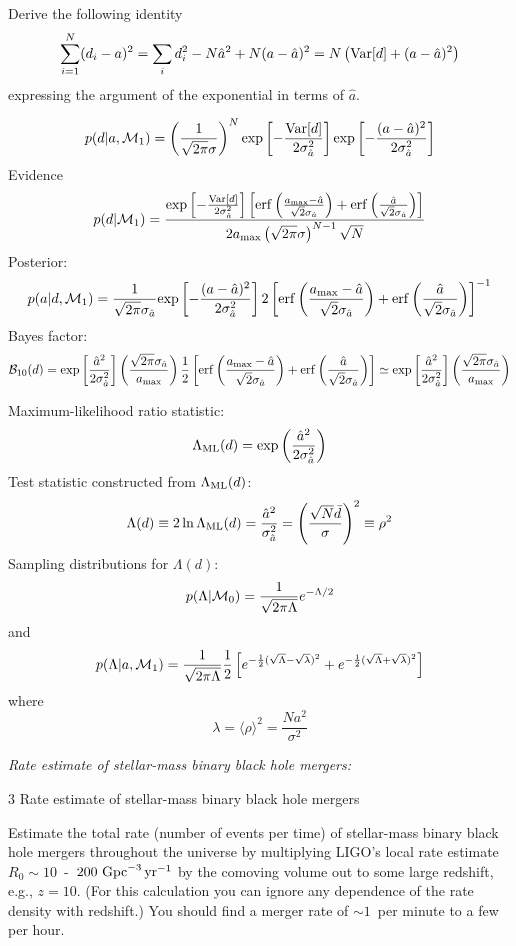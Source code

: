 \documentclass[11pt]{article}
\def\be{\begin{equation}}
\def\ee{\end{equation}}
\def\i{\item{}}
\begin{document}
Derive the following identity
%
\be
\sum_{i=1}^N(d_i-a)^2 =\sum_i d_i^2 - N\hat a^2+N(a-\hat a)^2
= N\left({\rm Var}[d] + (a-\hat a)^2\right)
\ee
%
expressing the argument of the exponential in terms of $\hat a$.


\be
p(d|a,{\cal M}_1)=\left(\frac{1}{\sqrt{2\pi}\sigma}\right)^N
{\rm exp}\left[-\frac{{\rm Var}[d]}{2\sigma^2_{\hat a}}\right]
{\rm exp}\left[-\frac{(a-\hat a)^2}{2\sigma^2_{\hat a}}\right]
\ee
%
Evidence
%
\be
p(d|{\cal M}_1)=
\frac{{\rm exp}\left[-\frac{{\rm Var}[d]}{2\sigma^2_{\hat a}}\right]
\left[
{\rm erf}\left(\frac{a_{\rm max}-\hat a}{\sqrt{2}\sigma_{\hat a}}\right) +
{\rm erf}\left(\frac{\hat a}{\sqrt{2}\sigma_{\hat a}}\right) 
\right]}
{2a_{\rm max}\left(\sqrt{2\pi}\sigma\right)^{N-1}\sqrt{N}}
\ee
%
Posterior:
%
\be
p(a|d,{\cal M}_1)=\frac{1}{\sqrt{2\pi}\sigma_{\hat a}}{\rm exp}\left[-\frac{(a-\hat a)^2}{2\sigma^2_{\hat a}}\right]
2\left[
{\rm erf}\left(\frac{a_{\rm max}-\hat a}{\sqrt{2}\sigma_{\hat a}}\right) +
{\rm erf}\left(\frac{\hat a}{\sqrt{2}\sigma_{\hat a}}\right) 
\right]^{-1}
\ee
%
Bayes factor:
%
\be
{\cal B}_{10}(d) = {\rm exp}\left[\frac{\hat a^2}{2\sigma^2_{\hat a}}\right]
\left(\frac{\sqrt{2\pi}\sigma_{\hat a}}{a_{\rm max}}\right)
\frac{1}{2}\left[
{\rm erf}\left(\frac{a_{\rm max}-\hat a}{\sqrt{2}\sigma_{\hat a}}\right) +
{\rm erf}\left(\frac{\hat a}{\sqrt{2}\sigma_{\hat a}}\right) 
\right]
\simeq {\rm exp}\left[\frac{\hat a^2}{2\sigma^2_{\hat a}}\right]
\left(\frac{\sqrt{2\pi}\sigma_{\hat a}}{a_{\rm max}}\right)
\ee

Maximum-likelihood ratio statistic:
%
\be
\Lambda_{\rm ML}(d) = {\rm exp}\left(\frac{\hat a^2}{2\sigma^2_{\hat a}}\right)
\ee
%
Test statistic constructed from $\Lambda_{\rm ML}(d)$:
%
\be
\Lambda(d) \equiv 2\ln \Lambda_{\rm ML}(d) = \frac{\hat a^2}{\sigma^2_{\hat a}} = \left(\frac{\sqrt{N}\bar d}{\sigma}\right)^2 \equiv \rho^2
\ee
%
Sampling distributions for $\Lambda(d)$:
\be
p(\Lambda|{\cal M}_0) =\frac{1}{\sqrt{2\pi\Lambda}}e^{-\Lambda/2}
\ee
%
and
%
\be
p(\Lambda|a,{\cal M}_1) =\frac{1}{\sqrt{2\pi\Lambda}}\frac{1}{2}\left[
e^{-\frac{1}{2}(\sqrt{\Lambda}-\sqrt{\lambda})^2}
+e^{-\frac{1}{2}(\sqrt{\Lambda}+\sqrt{\lambda})^2}
\right]
\ee
%
where
%
\be
\lambda=
\langle\rho\rangle^2=\frac{Na^2}{\sigma^2}
\ee


\i {\em Rate estimate of stellar-mass binary black hole mergers:}
{3 Rate estimate of stellar-mass binary black hole mergers}

Estimate the total rate (number of events per time) of 
stellar-mass binary black hole mergers throughout the universe 
by multiplying LIGO's local rate 
estimate $R_0 \sim 10$~-~$200~{\rm Gpc}^{-3}\,{\rm yr}^{-1}$ by 
the comoving volume out to some large redshift, e.g., $z= 10$.
(For this calculation you can ignore any dependence of the 
rate density with redshift.)
You should find a merger rate of $\sim\!1$~per minute to a few 
per hour.
\end{document}
